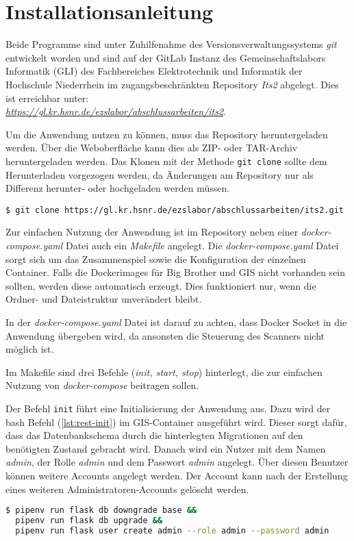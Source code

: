 \section{Installationsanleitung}
Beide Programme sind unter Zuhilfenahme des Versionsverwaltungssystems \textit{git} entwickelt worden und sind auf der GitLab Instanz des Gemeinschaftslabors Informatik (GLI) des Fachbereiches Elektrotechnik und Informatik der Hochschule Niederrhein im zugangsbeschränkten Repository \textit{Its2} abgelegt. Dies ist erreichbar unter: \\ \textit{\url{https://gl.kr.hsnr.de/ezslabor/abschlussarbeiten/its2}}.

Um die Anwendung nutzen zu können, muss das Repository heruntergeladen werden.
Über die Weboberfläche kann dies als ZIP- oder TAR-Archiv heruntergeladen werden. Das Klonen mit der Methode \texttt{git clone} sollte dem Herunterladen vorgezogen werden, da Änderungen am Repository nur als Differenz herunter- oder hochgeladen werden müssen.

\begin{lstlisting}[caption={git clone (bash)}, captionpos=b, label={lst:git-clone}]
$ git clone https://gl.kr.hsnr.de/ezslabor/abschlussarbeiten/its2.git
\end{lstlisting}

Zur einfachen Nutzung der Anwendung ist im Repository neben einer \textit{docker-compose.yaml} Datei auch ein \textit{Makefile} angelegt. Die \textit{docker-compose.yaml} Datei sorgt sich um das Zusammenspiel sowie die Konfiguration der einzelnen Container. Falls die Dockerimages für Big Brother und GIS nicht vorhanden sein sollten, werden diese automatisch erzeugt. \linebreak Dies funktioniert nur, wenn die Ordner- und Dateistruktur unverändert bleibt.

In der \textit{docker-compose.yaml} Datei ist darauf zu achten, dass Docker Socket in die Anwendung übergeben wird, da ansonsten die Steuerung des Scanners nicht möglich ist.

Im Makefile sind drei Befehle (\textit{init, start, stop}) hinterlegt, die zur einfachen Nutzung von \textit{docker-compose} beitragen sollen.

Der Befehl \texttt{init} führt eine Initialisierung der Anwendung aus. Dazu wird der bash Befehl (\autoref{lst:rest-init}) im GIS-Container ausgeführt wird. Dieser sorgt dafür, dass das Datenbankschema durch die hinterlegten Migrationen auf den benötigten Zustand gebracht wird. Danach wird ein Nutzer mit dem Namen \textit{admin}, der Rolle \textit{admin} und dem Passwort \textit{admin} angelegt. Über diesen Benutzer können weitere Accounts angelegt werden. Der Account kann nach der \linebreak Erstellung eines weiteren Administratoren-Accounts gelöscht werden.
\begin{lstlisting}[language=bash, caption={Initialisierung REST-Interface (bash)}, captionpos=b, label={lst:rest-init}]
$ pipenv run flask db downgrade base && 
  pipenv run flask db upgrade && 
  pipenv run flask user create admin --role admin --password admin
\end{lstlisting}

